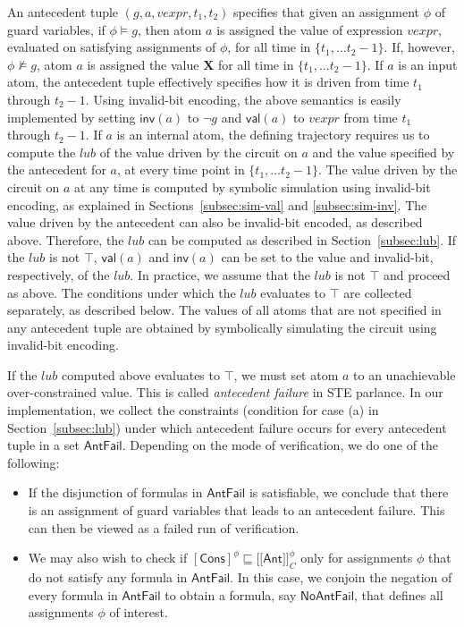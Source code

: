 \documentclass{llncs}
\newcommand{\val}{\ensuremath{\mathsf{val}}}
\newcommand{\inv}{\ensuremath{\mathsf{inv}}}
\newcommand{\lsem}{\ensuremath{[\![}}
\newcommand{\rsem}{\ensuremath{]\!]}}
\newcommand{\ant}{\ensuremath{\mathsf{Ant}}}
\newcommand{\AntFail}{\ensuremath{\mathsf{AntFail}}}
\newcommand{\NoAntFail}{\ensuremath{\mathsf{NoAntFail}}}
\newcommand{\cons}{\ensuremath{\mathsf{Cons}}}
\begin{document}
An antecedent tuple $(g, a, vexpr, t_1, t_2)$ specifies that given an
assignment $\phi$ of guard variables, if $\phi \models g$, then atom
$a$ is assigned the value of expression $vexpr$, evaluated on satisfying
assignments of $\phi$,
for all time in $\{t_1, \ldots t_2 - 1\}$.  If, however, $\phi
\not\models g$, atom $a$ is assigned the value $\mathbf{X}$ for all
time in $\{t_1, \ldots t_2-1\}$.  If $a$ is an input atom, the
antecedent tuple effectively specifies how it is driven from time
$t_1$ through $t_2-1$.  Using invalid-bit encoding, the above
semantics is easily implemented by setting ${\inv}(a)$ to $\neg g$ and
${\val}(a)$ to $vexpr$ from time $t_1$ through $t_2-1$.  If $a$ is an
internal atom, the defining trajectory requires us to compute the
$lub$ of the value driven by the circuit on $a$ and the value
specified by the antecedent for $a$, at every time point in $\{t_1,
\ldots t_2-1\}$.  The value driven by the circuit on $a$ at any time
is computed by symbolic simulation using invalid-bit encoding, as
explained in Sections~\ref{subsec:sim-val} and \ref{subsec:sim-inv}.
The value driven by the antecedent can also be invalid-bit encoded, as
described above.  Therefore, the $lub$ can be computed as described in
Section~\ref{subsec:lub}.  If the $lub$ is not $\top$, ${\val}(a)$ and
${\inv}(a)$ can be set to the value and invalid-bit, respectively, of
the $lub$.  In practice, we assume that the $lub$ is not $\top$ and
proceed as above. The conditions under which the $lub$ evaluates to
$\top$ are collected separately, as described below.  The values of
all atoms that are not specified in any antecedent tuple are obtained
by symbolically simulating the circuit using invalid-bit encoding.

If the $lub$ computed above evaluates to $\top$, we must set atom $a$
to an unachievable over-constrained value.  This is called
\emph{antecedent failure} in STE parlance.  In our implementation, we
collect the constraints (condition for case (a) in
Section~\ref{subsec:lub}) under which antecedent failure occurs for
every antecedent tuple in a set {\AntFail}.  Depending on the mode of
verification, we do one of the following:
\begin{itemize}
\item If the disjunction of formulas in {\AntFail} is satisfiable, we
  conclude that there is an assignment of guard variables that leads
  to an antecedent failure.  This can then be viewed as a failed run
  of verification.
\item We may also wish to check if $[\cons]^\phi \sqsubseteq \lsem
  \ant \rsem_C^\phi$ only for assignments $\phi$ that do not satisfy
  any formula in ${\AntFail}$.  In this case, we conjoin the negation
  of every formula in ${\AntFail}$ to obtain a formula, say
  ${\NoAntFail}$, that defines all assignments $\phi$ of interest.
\end{itemize}
\end{document}
